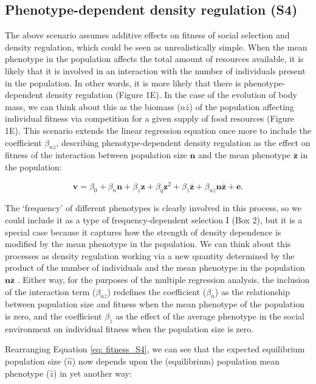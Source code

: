 \documentclass{article}
\begin{document}
	\subsection{Phenotype-dependent density regulation (S4)}
	The above scenario assumes additive effects on fitness of social selection and density regulation, which could be seen as unrealistically simple. When the mean phenotype in the population affects the total amount of resources available, it is likely that it is involved in an interaction with the number of individuals present in the population. In other words, it is more likely that there is phenotype-dependent density regulation (Figure 1E). In the case of the evolution of body mass, we can think about this as the biomass (${n\bar{z}}$) of the population affecting individual fitness via competition for a given supply of food resources (Figure 1E). This scenario extends the linear regression equation once more to include the coefficient $\beta_{n \bar{z}}$, describing phenotype-dependent density regulation as the effect on fitness of the interaction between population size $\bm{n}$ and the mean phenotype $\bar{\bm{z}}$ in the population: 
	
	\begin{equation} \label{eq: fitness_S4}
	\bm{v}=\beta_{0} +\beta_{n} \bm{n} + \beta_{z} \bm{z} + \beta_{q} \bm{z}^2 + \beta_{\bar{z}} \bar{\bm{z}} + \beta_{n\bar{z}} \bm{n} \bar{\bm{z}}  +  \bm{e}.
	\end{equation}
	
	The `frequency' of different phenotypes is clearly involved in this process, so we could include it as a type of frequency-dependent selection I (Box 2), but it is a special case because it captures how the strength of density dependence is modified by the mean phenotype in the population. We can think about this processes as density regulation working via a new quantity determined by the product of the number of individuals and the mean phenotype in the population $\bm{n}\bar{\bm{z}}$ \citep{Engen2020}. Either way, for the purposes of the multiple regression analysis, the inclusion of the interaction term ($\beta_{n\bar{z}}$) redefines the coefficient ($\beta_{n}$) as the relationship between population size and fitness when the mean phenotype of the population is zero, and the coefficient $ \beta_{\bar{z}}$ as the effect of the average phenotype in the social environment on individual fitness when the population size is zero. 
	
	Rearranging Equation \ref{eq: fitness_S4}, we can see that the expected equilibrium population size ($\hat{n}$) now depends upon the (equilibrium) population mean phenotype ($\hat{z}$) in yet another way:
	
\end{document}

